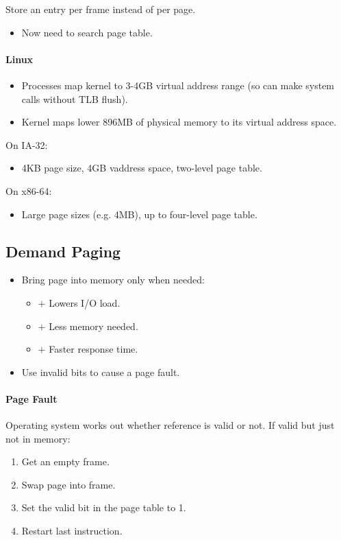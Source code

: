 \documentclass[twocolumn,english]{article}
\begin{document}
Store an entry per frame instead of per page. 
\begin{itemize}
\item Now need to search page table. 
\end{itemize}

\paragraph{Linux}
\begin{itemize}
\item Processes map kernel to 3-4GB virtual address range (so can make system
calls without TLB flush).
\item Kernel maps lower 896MB of physical memory to its virtual address
space.
\end{itemize}
On IA-32:
\begin{itemize}
\item 4KB page size, 4GB vaddress space, two-level page table.
\end{itemize}
On x86-64:
\begin{itemize}
\item Large page sizes (e.g. 4MB), up to four-level page table.
\end{itemize}

\subsection{Demand Paging}
\begin{itemize}
\item Bring page into memory only when needed: 

\begin{itemize}
\item $+$ Lowers I/O load. 
\item $+$ Less memory needed. 
\item $+$ Faster response time. 
\end{itemize}
\item Use invalid bits to cause a page fault. 
\end{itemize}

\paragraph{Page Fault}

Operating system works out whether reference is valid or not. If valid
but just not in memory: 
\begin{enumerate}
\item Get an empty frame. 
\item Swap page into frame. 
\item Set the valid bit in the page table to 1. 
\item Restart last instruction. 
\end{enumerate}
\end{document}

